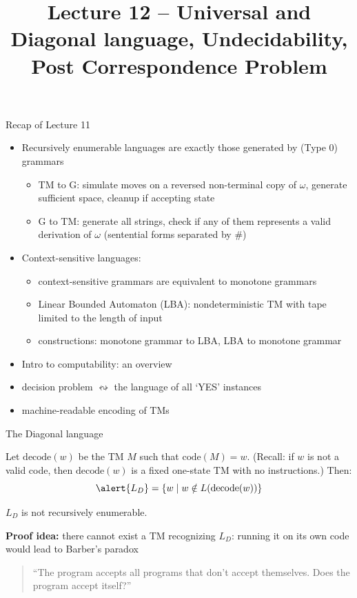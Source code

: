 \documentclass[handout]{beamer}
\title{Lecture 12 -- Universal and Diagonal language, Undecidability, Post Correspondence Problem}
\begin{document}
\frame{\titlepage}


\begin{frame}{Recap of Lecture 11}
	
    \begin{itemize}        
        \item Recursively enumerable languages are exactly those generated by (Type 0) grammars
        \begin{itemize}
            \item TM to G: simulate moves on a reversed non-terminal copy of $\omega$, generate sufficient space, cleanup if accepting state
            \item G to TM: generate all strings, check if any of them represents a valid derivation of $\omega$ (sentential forms separated by $\#$)
        \end{itemize}   
        \item Context-sensitive languages:
        \begin{itemize}
            \item context-sensitive grammars are equivalent to monotone grammars
            \item Linear Bounded Automaton (LBA): nondeterministic TM with tape limited to the length of input
            \item constructions: monotone grammar to LBA, LBA to monotone grammar
        \end{itemize}
        \item Intro to computability: an overview
        \item decision problem $\leftrightsquigarrow$ the language of all `YES' instances
        \item machine-readable encoding of TMs
    \end{itemize}
	
\end{frame}


\begin{frame}{The Diagonal language}
    
    Let \alert{$\mathrm{decode}(w)$} be the TM $M$ such that $\mathrm{code}(M)=w$. (Recall: if $w$ is not a valid code, then $\mathrm{decode}(w)$ is a fixed one-state TM with no instructions.) Then:
    $$
    \alert{L_D}=\{w\mid w\notin L(\mathrm{decode}(w))\}
    $$
        
    \begin{theorem}
        $L_D$ is not recursively enumerable.
    \end{theorem}
    
    \textbf{Proof idea:} there cannot exist a TM recognizing $L_D$: running it on its own code would lead to Barber's paradox

    \bigskip

    \begin{quote}
        ``The program accepts all programs that don't accept themselves. Does the program accept itself?''
    \end{quote}

\end{frame}
\end{document}
